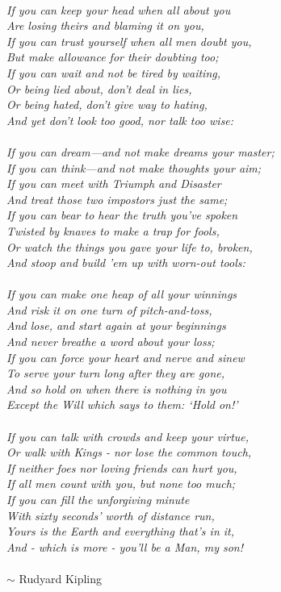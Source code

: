 \clearpage
\thispagestyle{empty}
\vspace*{\fill}
\textit{\\ \noindent If you can keep your head when all about you\\
\indent Are losing theirs and blaming it on you,\\
If you can trust yourself when all men doubt you,\\
\indent But make allowance for their doubting too;\\
If you can wait and not be tired by waiting,\\
\indent Or being lied about, don’t deal in lies,\\
Or being hated, don’t give way to hating,\\
\indent And yet don’t look too good, nor talk too wise:\\}
\textit{\\ \noindent If you can dream—and not make dreams your master;\\
\indent If you can think—and not make thoughts your aim;\\
If you can meet with Triumph and Disaster\\
\indent And treat those two impostors just the same;\\
If you can bear to hear the truth you’ve spoken\\
\indent Twisted by knaves to make a trap for fools,\\
Or watch the things you gave your life to, broken,\\
\indent And stoop and build ’em up with worn-out tools:\\}
\textit{\\ \noindent If you can make one heap of all your winnings\\
\indent And risk it on one turn of pitch-and-toss,\\
And lose, and start again at your beginnings\\
\indent And never breathe a word about your loss;\\
If you can force your heart and nerve and sinew\\
\indent To serve your turn long after they are gone,\\
And so hold on when there is nothing in you\\
\indent Except the Will which says to them: `Hold on!'\\}
\textit{\\ \noindent If you can talk with crowds and keep your virtue,\\
\indent Or walk with Kings - nor lose the common touch,\\
If neither foes nor loving friends can hurt you,\\
\indent If all men count with you, but none too much;\\
If you can fill the unforgiving minute\\
\indent With sixty seconds’ worth of distance run,\\
Yours is the Earth and everything that’s in it,\\
\indent And - which is more - you’ll be a Man, my son!\\ \\}
$\sim$ Rudyard Kipling

\vspace*{\fill}